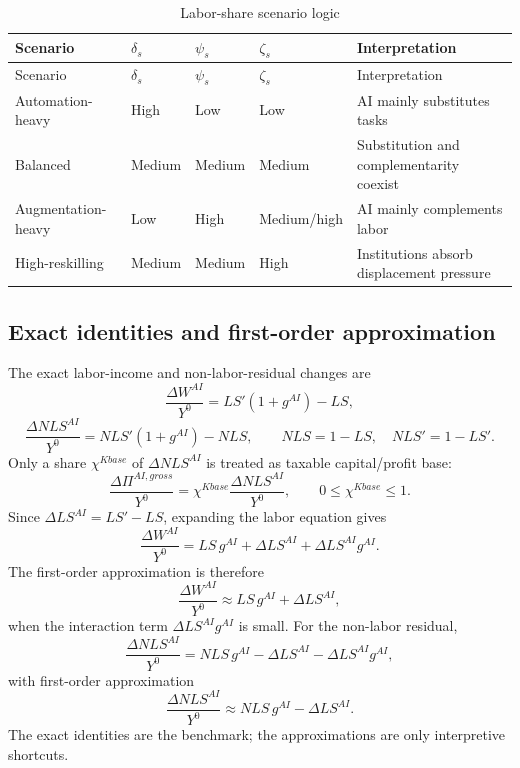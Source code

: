 \documentclass[11pt,a4paper]{article}
\begin{document}
\begin{longtable}{p{}p{}p{}p{}p{}}
\caption{Labor-share scenario logic}\label{tab:labor_share_scenarios}\\
\toprule
Scenario & $\delta_s$ & $\psi_s$ & $\zeta_s$ & Interpretation \\
\midrule
\endfirsthead
\toprule
Scenario & $\delta_s$ & $\psi_s$ & $\zeta_s$ & Interpretation \\
\midrule
\endhead
Automation-heavy & High & Low & Low & AI mainly substitutes tasks \\
Balanced & Medium & Medium & Medium & Substitution and complementarity coexist \\
Augmentation-heavy & Low & High & Medium/high & AI mainly complements labor \\
High-reskilling & Medium & Medium & High & Institutions absorb displacement pressure \\
\bottomrule
\end{longtable}


\subsection{Exact identities and first-order approximation}

The exact labor-income and non-labor-residual changes are
\begin{equation}
    \frac{\Delta W^{AI}}{Y^0}=LS'(1+g^{AI})-LS,
\end{equation}
\begin{equation}
    \frac{\Delta NLS^{AI}}{Y^0}=NLS'(1+g^{AI})-NLS,
    \qquad NLS=1-LS,\quad NLS'=1-LS'.
\end{equation}
Only a share $\chi^{Kbase}$ of $\Delta NLS^{AI}$ is treated as taxable capital/profit base:
\begin{equation}
    \frac{\Delta \Pi^{AI,gross}}{Y^0}=\chi^{Kbase}\frac{\Delta NLS^{AI}}{Y^0},\qquad 0\leq\chi^{Kbase}\leq1.
\end{equation}
Since $\Delta LS^{AI}=LS'-LS$, expanding the labor equation gives
\begin{equation}
    \frac{\Delta W^{AI}}{Y^0}
    =LS\,g^{AI}+\Delta LS^{AI}+\Delta LS^{AI}g^{AI}.
\end{equation}
The first-order approximation is therefore
\begin{equation}
    \frac{\Delta W^{AI}}{Y^0}\approx LS\,g^{AI}+\Delta LS^{AI},
\end{equation}
when the interaction term $\Delta LS^{AI}g^{AI}$ is small. For the non-labor residual,
\begin{equation}
    \frac{\Delta NLS^{AI}}{Y^0}
    =NLS\,g^{AI}-\Delta LS^{AI}-\Delta LS^{AI}g^{AI},
\end{equation}
with first-order approximation
\begin{equation}
    \frac{\Delta NLS^{AI}}{Y^0}\approx NLS\,g^{AI}-\Delta LS^{AI}.
\end{equation}
The exact identities are the benchmark; the approximations are only interpretive shortcuts.
\end{document}
